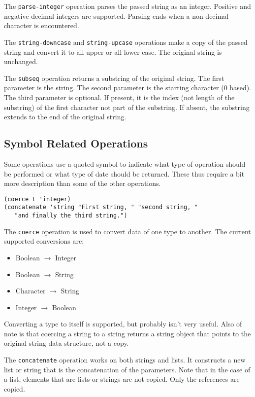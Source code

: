 \documentclass[10pt, openany]{book}
\newcommand{\function}[1]{\texttt{#1}}
\begin{document}
The \function{parse-integer} operation parses the passed string as an integer.  Positive and negative decimal integers are supported.  Parsing ends when a non-decimal character is encountered.

The \function{string-downcase} and \function{string-upcase} operations make a copy of the passed string and convert it to all upper or all lower case.  The original string is unchanged.

The \function{subseq} operation returns a substring of the original string.  The first parameter is the string.  The second parameter is the starting character (0 based).  The third parameter is optional.  If present, it is the index (not length of the substring) of the first character  not part of the substring.  If absent, the substring extends to the end of the original string.

\subsection{Symbol Related Operations}
Some operations use a quoted symbol to indicate what type of operation should be performed or what type of date should be returned.  These thus require a bit more description than some of the other operations.
\begin{lstlisting}
(coerce t 'integer)
(concatenate 'string "First string, " "second string, "
   "and finally the third string.")
\end{lstlisting}

The \function{coerce} operation is used to convert data of one type to another.  The current supported conversions are:
\begin{itemize}
\item Boolean $\rightarrow$ Integer
\item Boolean $\rightarrow$ String
\item Character $\rightarrow$ String
\item Integer $\rightarrow$ Boolean
\end{itemize}

Converting a type to itself is supported, but probably isn't very useful.  Also of note is that coercing a string to a string returns a string object that points to the original string data structure, not a copy.

The \function{concatenate} operation works on both strings and lists.  It constructs a new list or string that is the concatenation of the parameters.  Note that in the case of a list, elements that are lists or strings are not copied.  Only the references are copied.
\end{document}
